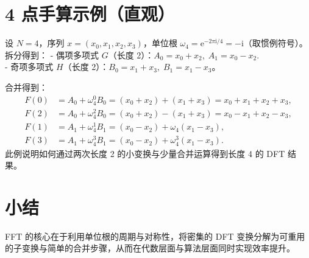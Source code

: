 \documentclass{ctexart}
\newcommand{\ii}{\mathrm{i}}       %
\begin{document}
\section{4 点手算示例（直观）}
设 $N=4$，序列 $x=(x_0,x_1,x_2,x_3)$，单位根 $\omega_4=\mathrm{e}^{-2\pi\ii/4}=-\mathrm{i}$（取惯例符号）。拆分得到：
- 偶项多项式 $G$（长度 2）：$A_0=x_0+x_2,\;A_1=x_0-x_2$.\\ 
- 奇项多项式 $H$（长度 2）：$B_0=x_1+x_3,\;B_1=x_1-x_3$。

合并得到：
\begin{align*}
F(0)&=A_0+\omega_4^{0}B_0=(x_0+x_2)+(x_1+x_3)=x_0+x_1+x_2+x_3,\\
F(2)&=A_0+\omega_4^{2}B_0=(x_0+x_2)-(x_1+x_3)=x_0-x_1+x_2-x_3,\\
F(1)&=A_1+\omega_4^{1}B_1=(x_0-x_2)+\omega_4(x_1-x_3),\\
F(3)&=A_1+\omega_4^{3}B_1=(x_0-x_2)+\omega_4^{3}(x_1-x_3).
\end{align*}
此例说明如何通过两次长度 2 的小变换与少量合并运算得到长度 4 的 DFT 结果。

\section{小结}
FFT 的核心在于利用单位根的周期与对称性，将密集的 DFT 变换分解为可重用的子变换与简单的合并步骤，从而在代数层面与算法层面同时实现效率提升。
\end{document}
